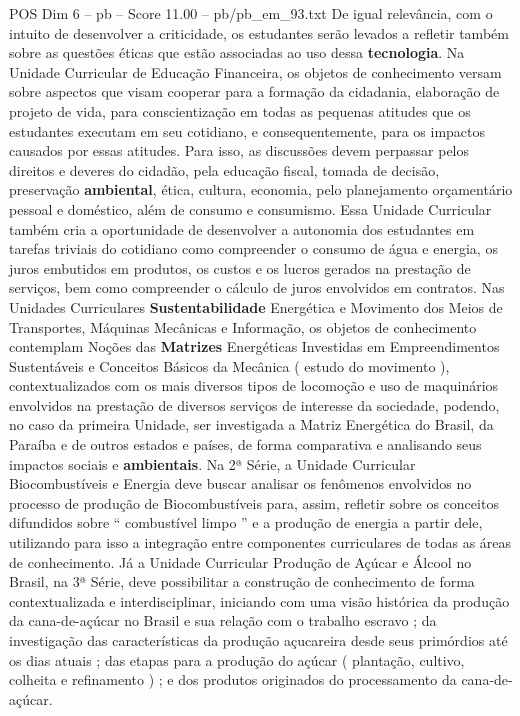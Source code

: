 \begin{textsample}{POS Dim 6 – pb – Score 11.00 – pb/pb\_em\_93.txt}
De igual relevância, com o intuito de desenvolver a criticidade, os estudantes serão levados a refletir também sobre as questões éticas que estão associadas ao uso dessa \textbf{tecnologia}.
Na Unidade Curricular de Educação Financeira, os objetos de conhecimento versam sobre aspectos que visam cooperar para a formação da cidadania, elaboração de projeto de vida, para conscientização em todas as pequenas atitudes que os estudantes executam em seu cotidiano, e consequentemente, para os impactos causados por essas atitudes.
Para isso, as discussões devem perpassar pelos direitos e deveres do cidadão, pela educação fiscal, tomada de decisão, preservação \textbf{ambiental}, ética, cultura, economia, pelo planejamento orçamentário pessoal e doméstico, além de consumo e consumismo.
Essa Unidade Curricular também cria a oportunidade de desenvolver a autonomia dos estudantes em tarefas triviais do cotidiano como compreender o consumo de água e energia, os juros embutidos em produtos, os custos e os lucros gerados na prestação de serviços, bem como compreender o cálculo de juros envolvidos em contratos.
Nas Unidades Curriculares \textbf{Sustentabilidade} Energética e Movimento dos Meios de Transportes, Máquinas Mecânicas e Informação, os objetos de conhecimento contemplam Noções das \textbf{Matrizes} Energéticas Investidas em Empreendimentos Sustentáveis e Conceitos Básicos da Mecânica ( estudo do movimento ), contextualizados com os mais diversos tipos de locomoção e uso de maquinários envolvidos na prestação de diversos serviços de interesse da sociedade, podendo, no caso da primeira Unidade, ser investigada a Matriz Energética do Brasil, da Paraíba e de outros estados e países, de forma comparativa e analisando seus impactos sociais e \textbf{ambientais}.
Na 2ª Série, a Unidade Curricular Biocombustíveis e Energia deve buscar analisar os fenômenos envolvidos no processo de produção de Biocombustíveis para, assim, refletir sobre os conceitos difundidos sobre “ combustível limpo ” e a produção de energia a partir dele, utilizando para isso a integração entre componentes curriculares de todas as áreas de conhecimento.
Já a Unidade Curricular Produção de Açúcar e Álcool no Brasil, na 3ª Série, deve possibilitar a construção de conhecimento de forma contextualizada e interdisciplinar, iniciando com uma visão histórica da produção da cana-de-açúcar no Brasil e sua relação com o trabalho escravo ; da investigação das características da produção açucareira desde seus primórdios até os dias atuais ; das etapas para a produção do açúcar ( plantação, cultivo, colheita e refinamento ) ; e dos produtos originados do processamento da cana-de-açúcar.

\end{textsample}
